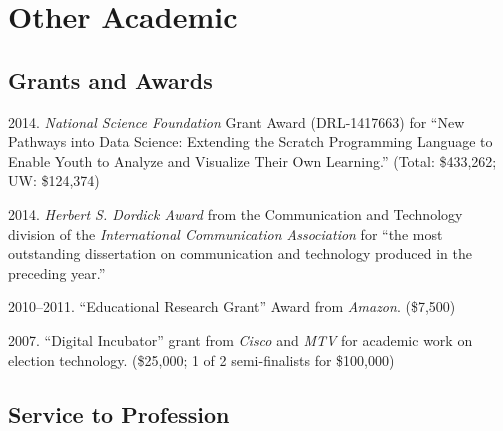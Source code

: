 \documentclass[10pt]{article}
\newenvironment{cvlist}{
\begin{list}{}{\leftmargin=3.0em \itemindent=-3.0em}
  \setlength{\itemsep}{0pt}
  \setlength{\parskip}{0em}
  \setlength{\parsep}{1em}
  \setlength{\parindent}{0em}}
{\vspace{1em}
\end{list}}
\begin{document}
\section{Other Academic}


\subsection{Grants and Awards}

\begin{cvlist}
\item 2014. \emph{National Science Foundation} Grant Award (DRL-1417663) for ``New Pathways into Data Science: Extending the Scratch Programming Language to Enable Youth to Analyze and Visualize Their Own Learning.'' (Total: \$433,262; UW: \$124,374)
\item 2014. \emph{Herbert S. Dordick Award} from the Communication and Technology division of the \emph{International Communication Association} for ``the most outstanding dissertation on communication and technology produced in the preceding year.''
\item 2010--2011. ``Educational Research Grant'' Award from \emph{Amazon}. (\$7,500)
\item 2007. ``Digital Incubator'' grant from \emph{Cisco} and \emph{MTV} for academic work on election technology. (\$25,000; 1 of 2 semi-finalists for \$100,000)
\end{cvlist}

\subsection{Service to Profession}
\end{document}
